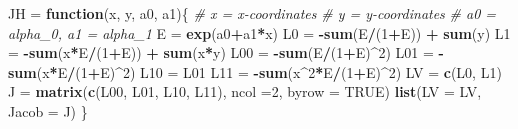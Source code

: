 \documentclass[
]{book}
\newenvironment{Shaded}{\begin{snugshade}}{\end{snugshade}}
\newcommand{\AttributeTok}[1]{\textcolor[rgb]{0.13,0.29,0.53}{#1}}
\newcommand{\CommentTok}[1]{\textcolor[rgb]{0.56,0.35,0.01}{\textit{#1}}}
\newcommand{\ConstantTok}[1]{\textcolor[rgb]{0.56,0.35,0.01}{#1}}
\newcommand{\ControlFlowTok}[1]{\textcolor[rgb]{0.13,0.29,0.53}{\textbf{#1}}}
\newcommand{\DecValTok}[1]{\textcolor[rgb]{0.00,0.00,0.81}{#1}}
\newcommand{\FunctionTok}[1]{\textcolor[rgb]{0.13,0.29,0.53}{\textbf{#1}}}
\newcommand{\NormalTok}[1]{#1}
\newcommand{\OtherTok}[1]{\textcolor[rgb]{0.56,0.35,0.01}{#1}}
\newcommand{\SpecialCharTok}[1]{\textcolor[rgb]{0.81,0.36,0.00}{\textbf{#1}}}
\begin{document}
\begin{Shaded}
\begin{Highlighting}[]
\NormalTok{JH }\OtherTok{=} \ControlFlowTok{function}\NormalTok{(x, y, a0, a1)\{}
  \CommentTok{\# x = x{-}coordinates}
  \CommentTok{\# y = y{-}coordinates}
  \CommentTok{\# a0 = alpha\_0, a1 = alpha\_1}
\NormalTok{  E }\OtherTok{=} \FunctionTok{exp}\NormalTok{(a0}\SpecialCharTok{+}\NormalTok{a1}\SpecialCharTok{*}\NormalTok{x)}
\NormalTok{  L0 }\OtherTok{=} \SpecialCharTok{{-}}\FunctionTok{sum}\NormalTok{(E}\SpecialCharTok{/}\NormalTok{(}\DecValTok{1}\SpecialCharTok{+}\NormalTok{E)) }\SpecialCharTok{+} \FunctionTok{sum}\NormalTok{(y)}
\NormalTok{  L1 }\OtherTok{=} \SpecialCharTok{{-}}\FunctionTok{sum}\NormalTok{(x}\SpecialCharTok{*}\NormalTok{E}\SpecialCharTok{/}\NormalTok{(}\DecValTok{1}\SpecialCharTok{+}\NormalTok{E)) }\SpecialCharTok{+} \FunctionTok{sum}\NormalTok{(x}\SpecialCharTok{*}\NormalTok{y)}
\NormalTok{  L00 }\OtherTok{=} \SpecialCharTok{{-}}\FunctionTok{sum}\NormalTok{(E}\SpecialCharTok{/}\NormalTok{(}\DecValTok{1}\SpecialCharTok{+}\NormalTok{E)}\SpecialCharTok{\^{}}\DecValTok{2}\NormalTok{)}
\NormalTok{  L01 }\OtherTok{=} \SpecialCharTok{{-}}\FunctionTok{sum}\NormalTok{(x}\SpecialCharTok{*}\NormalTok{E}\SpecialCharTok{/}\NormalTok{(}\DecValTok{1}\SpecialCharTok{+}\NormalTok{E)}\SpecialCharTok{\^{}}\DecValTok{2}\NormalTok{)}
\NormalTok{  L10 }\OtherTok{=}\NormalTok{ L01}
\NormalTok{  L11 }\OtherTok{=}  \SpecialCharTok{{-}}\FunctionTok{sum}\NormalTok{(x}\SpecialCharTok{\^{}}\DecValTok{2}\SpecialCharTok{*}\NormalTok{E}\SpecialCharTok{/}\NormalTok{(}\DecValTok{1}\SpecialCharTok{+}\NormalTok{E)}\SpecialCharTok{\^{}}\DecValTok{2}\NormalTok{)}
\NormalTok{  LV }\OtherTok{=} \FunctionTok{c}\NormalTok{(L0, L1)}
\NormalTok{  J }\OtherTok{=} \FunctionTok{matrix}\NormalTok{(}\FunctionTok{c}\NormalTok{(L00, L01, L10, L11), }\AttributeTok{ncol =}\DecValTok{2}\NormalTok{, }\AttributeTok{byrow =} \ConstantTok{TRUE}\NormalTok{)}
  \FunctionTok{list}\NormalTok{(}\AttributeTok{LV =}\NormalTok{ LV, }\AttributeTok{Jacob =}\NormalTok{ J)}
\NormalTok{\}}
\end{Highlighting}
\end{Shaded}
\end{document}
